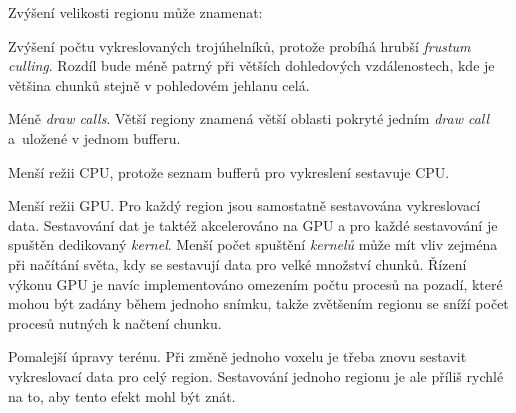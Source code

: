 Zvýšení velikosti regionu může znamenat:\nopagebreak
\begin{compactenum}
	\item Zvýšení počtu vykreslovaných trojúhelníků, protože probíhá hrubší \textit{frustum culling}. Rozdíl bude méně patrný při větších dohledových vzdálenostech, kde je většina chunků stejně v pohledovém jehlanu celá.
	\item Méně \textit{draw calls}. Větší regiony znamená větší oblasti pokryté jedním \textit{draw call} a~uložené v jednom bufferu.
	\item Menší režii CPU, protože seznam bufferů pro vykreslení sestavuje CPU.
	\item Menší režii GPU. Pro každý region jsou samostatně sestavována vykreslovací data. Sestavování dat je taktéž akcelerováno na GPU a pro každé sestavování je spuštěn dedikovaný \textit{kernel}. Menší počet spuštění \textit{kernelů} může mít vliv zejména při načítání světa, kdy se sestavují data pro velké množství chunků. Řízení výkonu GPU je navíc implementováno omezením počtu procesů na pozadí, které mohou být zadány během jednoho snímku, takže zvětšením regionu se sníží počet procesů nutných k načtení chunku.
	\item Pomalejší úpravy terénu. Při změně jednoho voxelu je třeba znovu sestavit vykreslovací data pro celý region. Sestavování jednoho regionu je ale příliš rychlé na to, aby tento efekt mohl být znát.
\end{compactenum}

